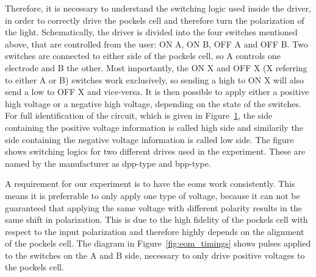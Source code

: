 Therefore, it is necessary to understand the switching logic used inside the driver, in order to correctly drive the pockels cell and therefore turn the polarization of the light. Schematically, the driver is divided into the four switches mentioned above, that are controlled from the user: ON A, ON B, OFF A and OFF B. Two switches are connected to either side of the pockels cell, so A controls one electrode and B the other. Most importantly, the ON X and OFF X (X referring to either A or B) switches work exclusively, so sending a high to ON X will also send a low to OFF X and vice-versa. It is then possible to apply either a positive high voltage or a negative high voltage, depending on the state of the switches. For full identification of the circuit, which is given in Figure~\ref{fig:eom_driver_switches}, the side containing the positive voltage information is called high side and similarily the side containing the negative voltage information is called low side. The figure shows switching logics for two different drives used in the experiment. These are named by the manufacturer as dpp-type and bpp-type.

\begin{figure}[t]%
\label{fig:eom_driver_switches}
\end{figure}

A requirement for our experiment is to have the \acp{eom} work consistently. This means it is preferrable to only apply one type of voltage, because it can not be guaranteed that applying the same voltage with different polarity results in the same shift in polarization. This is due to the high fidelity of the pockels cell with respect to the input polarization and therefore highly depends on the alignment of the pockels cell. The diagram in Figure~\ref{fig:eom_timings} shows pulses applied to the switches on the A and B side, necessary to only drive positive voltages to the pockels cell.

